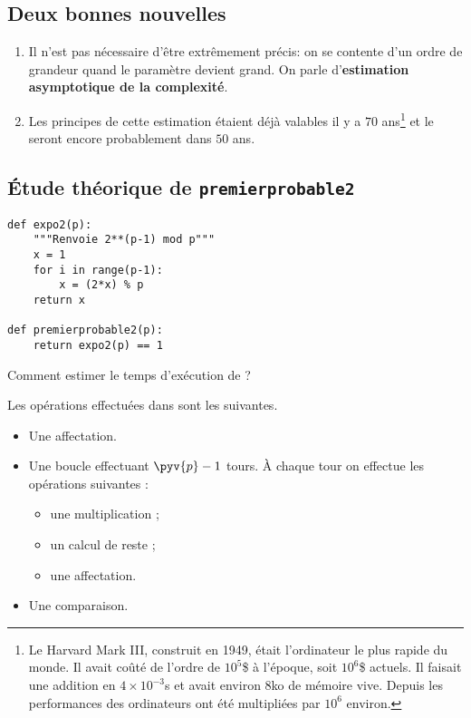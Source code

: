 \subsection{Deux bonnes nouvelles}

\begin{enumerate}
\item Il n'est pas nécessaire d'être extrêmement précis: on se
  contente d'un ordre de grandeur quand le paramètre devient grand. On
  parle d'\textbf{estimation asymptotique de la complexité}.
\item Les principes de cette estimation étaient déjà
  valables il y a $70$ ans\footnote{Le Harvard Mark III, construit en
    1949, était  l'ordinateur le plus rapide du
    monde. Il avait coûté de l'ordre de $10^{5}$\$ à l'époque, soit
    $10^{6}$\$ actuels. Il faisait une addition en $4\times 10^{-3}$s
    et avait environ $8$ko de mémoire vive. Depuis les performances
    des ordinateurs ont été multipliées par $10^{6}$ environ.} et le
  seront encore probablement dans $50$ ans.
\end{enumerate}

\subsection{Étude théorique de \texttt{premierprobable2}}

\begin{lstlisting}
def expo2(p):
    """Renvoie 2**(p-1) mod p"""
    x = 1
    for i in range(p-1):
        x = (2*x) % p
    return x  
    
def premierprobable2(p):
    return expo2(p) == 1
\end{lstlisting}

Comment estimer le temps d'exécution de ?

Les opérations effectuées dans  sont les suivantes.
\begin{itemize}
\item[\textbullet] Une affectation.
\item[\textbullet] Une boucle effectuant $\pyv{p}-1$ tours. À chaque tour on
  effectue les opérations suivantes :
  \begin{itemize}
  \item une multiplication ;
  \item un calcul de reste ;
  \item une affectation.
  \end{itemize}
\item[\textbullet] Une comparaison.
\end{itemize}

